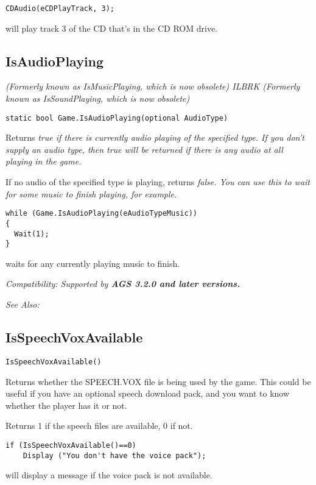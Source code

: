 \begin{verbatim}
CDAudio(eCDPlayTrack, 3);
\end{verbatim}
will play track 3 of the CD that's in the CD ROM drive.


\subsection{IsAudioPlaying}\label{Game.IsAudioPlaying}%

\it{(Formerly known as IsMusicPlaying, which is now obsolete)} ILBRK
\it{(Formerly known as IsSoundPlaying, which is now obsolete)}

\begin{verbatim}
static bool Game.IsAudioPlaying(optional AudioType)
\end{verbatim}
Returns \it{true} if there is currently audio playing of the specified type. If you don't
supply an audio type, then \it{true} will be returned if there is any audio at all playing
in the game.

If no audio of the specified type is playing, returns \it{false}. You can use this to wait
for some music to finish playing, for example.

\begin{verbatim}
while (Game.IsAudioPlaying(eAudioTypeMusic))
{
  Wait(1);
}
\end{verbatim}
waits for any currently playing music to finish.

\it{Compatibility:} Supported by \bf{AGS 3.2.0} and later versions.

\it{See Also:} 


\subsection{IsSpeechVoxAvailable}\label{IsSpeechVoxAvailable}%

\begin{verbatim}
IsSpeechVoxAvailable()
\end{verbatim}
Returns whether the SPEECH.VOX file is being used by the game.
This could be useful if you have an optional speech download pack, and
you want to know whether the player has it or not.

Returns 1 if the speech files are available, 0 if not.

\begin{verbatim}
if (IsSpeechVoxAvailable()==0)
    Display ("You don't have the voice pack");
\end{verbatim}
will display a message if the voice pack is not available.

